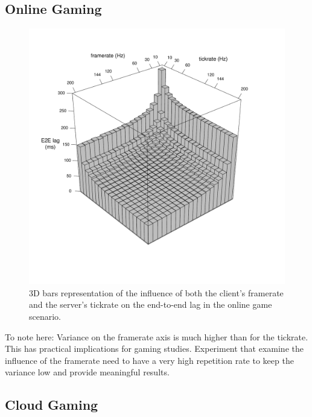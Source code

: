 \subsection{Online Gaming}

\begin{figure}[!t]
	\centering
	\includegraphics[width=1.0\columnwidth]{../simulation/visualization/e2e-lag-3dbars.pdf}
	\caption{3D bars representation of the influence of both the client's framerate and the server's tickrate on the end-to-end lag in the online game scenario.}
\label{fig:3dbars-framerate-tickrate-lag}
\end{figure}


To note here: Variance on the framerate axis is much higher than for the tickrate. This has practical implications for gaming studies. Experiment that examine the influence of the framerate need to have a very high repetition rate to keep the variance low and provide meaningful results.


\subsection{Cloud Gaming}


